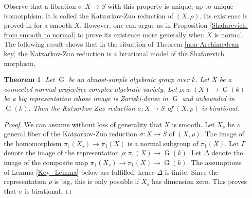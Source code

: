 \documentclass[11pt,letterpaper]{amsart}
\theoremstyle{plain}
\newtheorem{thm}{Theorem}[section]
\DeclareMathOperator{\rG}{G}
\begin{document}
Observe that a fibration $\sigma \colon X \rightarrow S$ with this property is unique, up to unique isomorphism. It is called the Katzarkov-Zuo reduction of $(X,\rho)$. Its existence is proved in \cite{Eyssidieux-reductive} for a smooth $X$. However, one can argue as in Proposition \ref{Shafarevich: from smooth to normal} to prove its existence more generally when $X$ is normal.\\

The following result shows that in the situation of Theorem \ref{non-Archimedean key} the Katzarkov-Zuo reduction is a birational model of the Shafarevich morphism.

\begin{thm}\label{relating_KZ_to_Shafa}
Let $\rG$ be an almost-simple algebraic group over $k$. Let $X$ be a connected normal projective complex algebraic variety. Let $\rho \colon \pi_1(X) \rightarrow \rG(k)$ be a big representation whose image is Zariski-dense in $\rG$ and unbounded in $\rG(k)$. Then the Katzarkov-Zuo reduction $\sigma \colon X \rightarrow S$ of $(X, \rho)$ is birational.
\end{thm}

\begin{proof}
We can assume without loss of generality that $X$ is smooth. Let $X_s$ be a general fiber of the Katzarkov-Zuo reduction $\sigma \colon X \rightarrow S$ of $(X, \rho)$. The image of the homomorphism $\pi_1(X_s) \to \pi_1(X)$ is a normal subgroup of $\pi_1(X)$. Let $\Gamma$ denote the image of the representation $\rho \colon \pi_1(X) \to \rG(k)$. Let $\Delta$ denote the image of the composite map $\pi_1(X_s) \to \pi_1(X) \to \rG(k)$. The assumptions of Lemma \ref{Key_Lemma} below are fulfilled, hence $\Delta$ is finite. Since the representation $\rho$ is big, this is only possible if $X_s$ has dimension zero. This proves that $\sigma$ is birational.
\end{proof}
\end{document}
